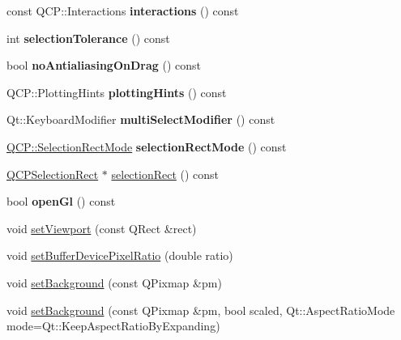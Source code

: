 \begin{DoxyCompactItemize}
\mbox{\label{class_q_custom_plot_a2c78c5fd2943c148ab76652801d3f2dc}} 
const Q\+C\+P\+::\+Interactions {\bfseries interactions} () const
\item 
\mbox{\label{class_q_custom_plot_a5441d11013afeaf4b8f2ea06e8624a25}} 
int {\bfseries selection\+Tolerance} () const
\item 
\mbox{\label{class_q_custom_plot_aca3f01f903fb250a3dd27104d92830be}} 
bool {\bfseries no\+Antialiasing\+On\+Drag} () const
\item 
\mbox{\label{class_q_custom_plot_ac724f4075822f74f7b676a790095b877}} 
Q\+C\+P\+::\+Plotting\+Hints {\bfseries plotting\+Hints} () const
\item 
\mbox{\label{class_q_custom_plot_a28182402ed11609c9a429f0788162d18}} 
Qt\+::\+Keyboard\+Modifier {\bfseries multi\+Select\+Modifier} () const
\item 
\mbox{\label{class_q_custom_plot_a6e53c402de2770a978dffa5584c05b27}} 
\hyperlink{namespace_q_c_p_ac9aa4d6d81ac76b094f9af9ad2d3aacf}{Q\+C\+P\+::\+Selection\+Rect\+Mode} {\bfseries selection\+Rect\+Mode} () const
\item 
\hyperlink{class_q_c_p_selection_rect}{Q\+C\+P\+Selection\+Rect} $\ast$ \hyperlink{class_q_custom_plot_ad7df2bcbba307e644db383b449e31efd}{selection\+Rect} () const
\item 
\mbox{\label{class_q_custom_plot_abe5556ac80dc0140fd57f2b2f94a1f0e}} 
bool {\bfseries open\+Gl} () const
\item 
void \hyperlink{class_q_custom_plot_a3f9bc4b939dd8aaba9339fd09f273fc4}{set\+Viewport} (const Q\+Rect \&rect)
\item 
void \hyperlink{class_q_custom_plot_a159162653ad6f8b8bf21263ba5787215}{set\+Buffer\+Device\+Pixel\+Ratio} (double ratio)
\item 
void \hyperlink{class_q_custom_plot_a130358592cfca353ff3cf5571b49fb00}{set\+Background} (const Q\+Pixmap \&pm)
\item 
void \hyperlink{class_q_custom_plot_a8513971d6aa24d8b0d6a68d45b542130}{set\+Background} (const Q\+Pixmap \&pm, bool scaled, Qt\+::\+Aspect\+Ratio\+Mode mode=Qt\+::\+Keep\+Aspect\+Ratio\+By\+Expanding)

\end{DoxyCompactItemize}
